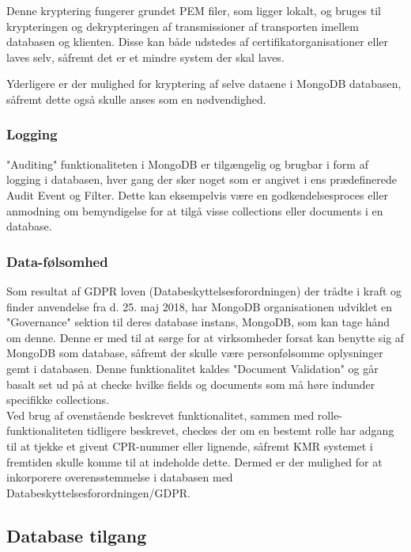 \begin{appendices}
Denne kryptering fungerer grundet PEM filer, som ligger lokalt, og bruges til krypteringen og dekrypteringen af transmissioner af transporten imellem databasen og klienten. Disse kan både udstedes af certifikatorganisationer eller laves selv, såfremt det er et mindre system der skal laves. \cite{mongodb_encryption}

Yderligere er der mulighed for kryptering af selve dataene i MongoDB databasen, såfremt dette også skulle anses som en nødvendighed.\\

\subsubsection{Logging}
"Auditing" funktionaliteten i MongoDB er tilgængelig og brugbar i form af logging i databasen, hver gang der sker noget som er angivet i ens prædefinerede Audit Event og Filter. Dette kan eksempelvis være en godkendelsesproces eller anmodning om bemyndigelse for at tilgå visse collections eller documents i en database. \\

\subsubsection{Data-følsomhed}
Som resultat af GDPR loven (Databeskyttelsesforordningen) \cite{GDPR} der trådte i kraft og finder anvendelse fra d. 25. maj 2018, har MongoDB organisationen udviklet en "Governance" sektion til deres database instans, MongoDB, som kan tage hånd om denne. Denne er med til at sørge for at virksomheder forsat kan benytte sig af MongoDB som database, såfremt der skulle være personfølsomme oplysninger gemt i databasen. Denne funktionalitet kaldes "Document Validation" og går basalt set ud på at checke hvilke fields og documents som må høre indunder specifikke collections.\\

Ved brug af ovenstående beskrevet funktionalitet, sammen med rolle-funktionaliteten tidligere beskrevet, checkes der om en bestemt rolle har adgang til at tjekke et givent CPR-nummer eller lignende, såfremt KMR systemet i fremtiden skulle komme til at indeholde dette. Dermed er der mulighed for at inkorporere overensstemmelse i databasen med Databeskyttelsesforordningen/GDPR. \\

\subsection{Database tilgang}


\end{appendices}
